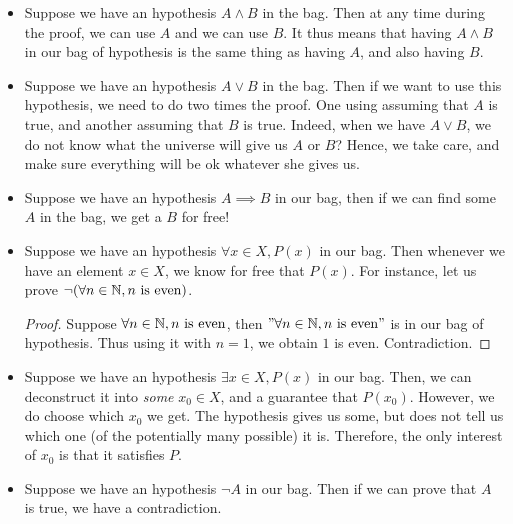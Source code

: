 \begin{itemize}
    \item Suppose we have an hypothesis \( A \land B \) in the bag. Then at any time during the proof, we can use \( A \) and we can use \( B \). It thus means that having \( A \land B \) in our bag of hypothesis is the same thing as having \( A \), and also having \( B \). 
    \item Suppose we have an hypothesis \( A \lor B \) in the bag. Then if we want to use this hypothesis, we need to do two times the proof. One using assuming that \( A \) is true, and another assuming that \( B \) is true. Indeed, when we have \( A \lor B \), we do not know what the universe will give us \( A \) or \( B \)? Hence, we take care, and make sure everything will be ok whatever she gives us.
    \item Suppose we have an hypothesis \( A \implies B \) in our bag, then if we can find some \( A \) in the bag, we get a \( B \) for free!  
    \item Suppose we have an hypothesis \( \forall x \in X, P(x) \) in our bag. Then whenever we have an element \( x \in X \), we know for free that \( P(x) \). For instance, let us prove \( \neg (\forall n \in \mathbb{N}, n\text{ is even}) \).
    \begin{proof}
        Suppose \( \forall n \in \mathbb{N}, n\text{ is even} \), then \( "\forall n \in \mathbb{N}, n\text{ is even}" \) is in our bag of hypothesis. Thus using it with \( n = 1 \), we obtain \( 1 \) is even. Contradiction.
    \end{proof}
    \item Suppose we have an hypothesis \( \exists x \in X, P(x) \) in our bag. Then, we can deconstruct it into \textit{some} \( x_0 \in X \), and a guarantee that \( P(x_0) \). However, we do  choose which \( x_0 \) we get. The hypothesis gives us some, but does not tell us which one (of the potentially many possible) it is. Therefore, the only interest of \( x_0 \) is that it satisfies \( P \).
    
    \item Suppose we have an hypothesis \( \neg A \) in our bag. Then if we can prove that \( A \) is true, we have a contradiction. 
    

\end{itemize}
